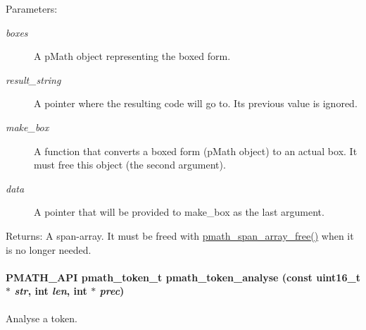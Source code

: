 \begin{Desc}
\item[Parameters:]
\begin{description}
\item[{\em boxes}]A pMath object representing the boxed form. \item[{\em result\_\-string}]A pointer where the resulting code will go to. Its previous value is ignored. \item[{\em make\_\-box}]A function that converts a boxed form (pMath object) to an actual box. It must free this object (the second argument). \item[{\em data}]A pointer that will be provided to make\_\-box as the last argument. \end{description}
\end{Desc}
\begin{Desc}
\item[Returns:]A span-array. It must be freed with \hyperlink{group__parser_gceb05ef4c39c239d68f39e3b9bde5f1e}{pmath\_\-span\_\-array\_\-free()} when it is no longer needed. \end{Desc}
\hypertarget{group__parser_g0cfde53ccdddc80d034dc5ee1ea54508}{
\paragraph[{pmath\_\-token\_\-analyse}]{\setlength{\rightskip}{0pt plus 5cm}PMATH\_\-API {\bf pmath\_\-token\_\-t} pmath\_\-token\_\-analyse (const uint16\_\-t $\ast$ {\em str}, \/  int {\em len}, \/  int $\ast$ {\em prec})}\hfill}
\label{group__parser_g0cfde53ccdddc80d034dc5ee1ea54508}


Analyse a token. 

